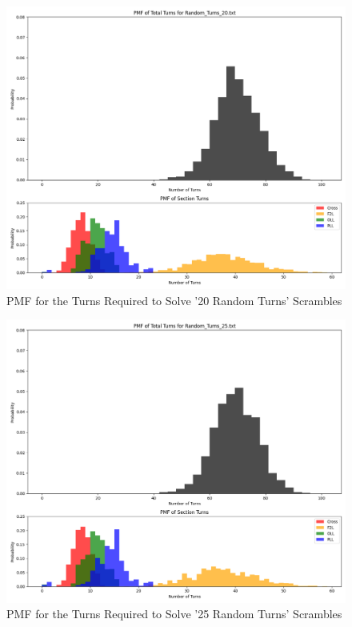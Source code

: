 \documentclass[12pt,letterpaper]{article}
\numberwithin{equation}{section}
\begin{document}
	\begin{figure}[H]
		\centering
		 \includegraphics[width=6in]{pmf_turns_20.png}
		 \caption{PMF for the Turns Required to Solve '20 Random Turns' Scrambles}
		 \label{fig:pmf_turns_20_plot}
	\end{figure}
	
	\begin{figure}[H]
		\centering
		 \includegraphics[width=6in]{pmf_turns_25.png}
		 \caption{PMF for the Turns Required to Solve '25 Random Turns' Scrambles}
		 \label{fig:pmf_turns_25_plot}
	\end{figure}
	
\end{document}
